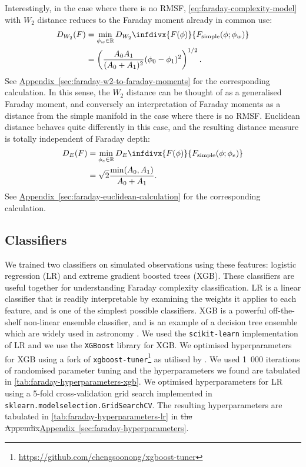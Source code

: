 \documentclass[11pt, a4paper]{book}
\newcommand{\aref}[1]{\hyperref[#1]{Appendix~\ref{#1}}}
\providecommand{\DIFdeltex}[1]{{\protect\color{red}\sout{#1}}}                      %
\providecommand{\DIFaddbegin}{} %
\providecommand{\DIFaddend}{} %
\providecommand{\DIFdelbegin}{} %
\providecommand{\DIFdelend}{} %
\providecommand{\DIFdel}[1]{\texorpdfstring{\DIFdeltex{#1}}{}} %
\newcommand{\DIFscaledelfig}{0.5}
\newlength{\DIFdelgraphicswidth} %
\newlength{\DIFdelgraphicsheight} %
\newcommand{\DIFaddincludegraphics}[2][]{{\color{blue}\fbox{\DIFOincludegraphics[#1]{#2}}}} %
\newcommand{\DIFdelincludegraphics}[2][]{%
\sbox{\DIFdelgraphicsbox}{\DIFOincludegraphics[#1]{#2}}%
\settoboxwidth{\DIFdelgraphicswidth}{\DIFdelgraphicsbox} %
\settoboxtotalheight{\DIFdelgraphicsheight}{\DIFdelgraphicsbox} %
\scalebox{\DIFscaledelfig}{%
\parbox[b]{\DIFdelgraphicswidth}{\usebox{\DIFdelgraphicsbox}\\[-\baselineskip] \rule{\DIFdelgraphicswidth}{0em}}\llap{\resizebox{\DIFdelgraphicswidth}{\DIFdelgraphicsheight}{%
\setlength{\unitlength}{\DIFdelgraphicswidth}%
\begin{picture}(1,1)%
\thicklines\linethickness{2pt} %
{\color[rgb]{1,0,0}\put(0,0){\framebox(1,1){}}}%
{\color[rgb]{1,0,0}\put(0,0){\line( 1,1){1}}}%
{\color[rgb]{1,0,0}\put(0,1){\line(1,-1){1}}}%
\end{picture}%
}\hspace*{3pt}}} %
} %
\DeclareRobustCommand{\DIFaddbegin}{\DIFOaddbegin \let\includegraphics\DIFaddincludegraphics} %
\DeclareRobustCommand{\DIFaddend}{\DIFOaddend \let\includegraphics\DIFOincludegraphics} %
\DeclareRobustCommand{\DIFdelbegin}{\DIFOdelbegin \let\includegraphics\DIFdelincludegraphics} %
\DeclareRobustCommand{\DIFdelend}{\DIFOaddend \let\includegraphics\DIFOincludegraphics} %
\begin{document}
    Interestingly, in the case where there is no RMSF, \autoref{eq:faraday-complexity-model} with $W_2$ distance reduces to the Faraday moment already in common use:
    \begin{align}
        D_{W_2}(F) &= \min_{\phi_w \in \mathbb{R}} D_{W_2}\infdivx{F(\phi)}{F_{\mathrm{simple}}(\phi; \phi_w)}\label{eq:faraday-W2-distance}\\
            &= \left(\frac{A_0A_1}{(A_0 + A_1)^2} (\phi_0 - \phi_1)^2\right)^{1/2}.
    \end{align}
    See \DIFdelbegin %
\DIFdelend \DIFaddbegin \aref{sec:faraday-w2-to-faraday-moments} \DIFaddend for the corresponding calculation. In this sense, the $W_2$ distance can be thought of as a generalised Faraday moment, and conversely an interpretation of Faraday moments as a distance from the simple manifold in the case where there is no RMSF. Euclidean distance behaves quite differently in this case, and the resulting distance measure is totally independent of Faraday depth:
    \begin{align}
        D_{E}(F) &= \min_{\phi_e \in \mathbb{R}} D_E\infdivx{F(\phi)}{F_{\mathrm{simple}}(\phi; \phi_e)}\label{eq:faraday-Euclidean-distance}\\
            &= \sqrt{2} \frac{\min(A_0, A_1)}{A_0 + A_1}.
    \end{align}
    See \aref{sec:faraday-euclidean-calculation} for the corresponding calculation.


  \subsection{Classifiers}
  \label{sec:faraday-classifiers}

    We trained two classifiers on simulated observations using these features: logistic regression (LR) and extreme gradient boosted trees (XGB). These classifiers are useful together for understanding Faraday complexity classification. LR is a linear classifier that is readily interpretable by examining the weights it applies to each feature, and is one of the simplest possible classifiers. XGB is a powerful off-the-shelf non-linear ensemble classifier, and is an example of a decision tree ensemble which are widely used in astronomy \citep[e.g.][]{machado_poletti_valle_shaping_2020,hlozek20lsst}. We used the \texttt{scikit-learn} implementation of LR and we use the \texttt{XGBoost} library for XGB. We optimised hyperparameters for XGB using a fork of \texttt{xgboost-tuner}\footnote{\url{https://github.com/chengsoonong/xgboost-tuner}} as utilised by \citet{zhu20mutagenic}. We used 1~000 iterations of randomised parameter tuning and the hyperparameters we found are tabulated in \autoref{tab:faraday-hyperparameters-xgb}. We optimised hyperparameters for LR using a 5-fold cross-validation grid search implemented in \texttt{sklearn.model\textunderscore{}selection.GridSearchCV}. The resulting hyperparameters are tabulated in \autoref{tab:faraday-hyperparameters-lr} in \DIFdelbegin \DIFdel{the Appendix}\DIFdelend \DIFaddbegin \aref{sec:faraday-hyperparameters}\DIFaddend .
\end{document}
